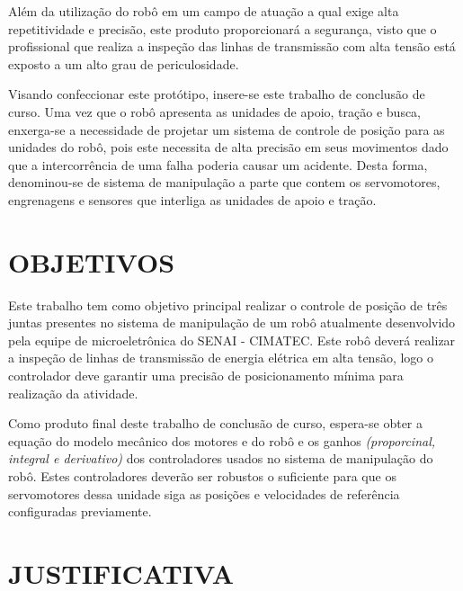 \documentclass[12pt,oneside,a4paper, chapter=TITLE, section = TITLE, english, brazil]{abntex2}
\begin{document}
Além da utilização do robô em um campo de atuação a qual exige alta repetitividade e precisão, este produto proporcionará a segurança, visto que o profissional que realiza a inspeção das linhas de transmissão com alta tensão está exposto a um alto grau de periculosidade.


Visando confeccionar este protótipo, insere-se este trabalho de conclusão de curso. Uma vez que o robô apresenta as unidades de apoio, tração e busca, enxerga-se a necessidade de projetar um sistema de controle de posição para as unidades do robô, pois este necessita de alta precisão em seus movimentos dado que a intercorrência de uma falha poderia causar um acidente. Desta forma, denominou-se de sistema de manipulação a parte que contem os servomotores, engrenagens e sensores que interliga as unidades de apoio e tração.


\section{OBJETIVOS} %

Este trabalho tem como objetivo principal realizar o controle de posição de três juntas presentes no sistema de manipulação de um robô atualmente desenvolvido pela equipe de microeletrônica do SENAI - CIMATEC. Este robô deverá realizar a inspeção de linhas de transmissão de energia elétrica em alta tensão, logo o controlador deve garantir uma precisão de posicionamento mínima para realização da atividade.

Como produto final deste trabalho de conclusão de curso, espera-se obter a equação do modelo mecânico dos motores e do robô e os ganhos \textit{(proporcinal, integral e derivativo)} dos controladores usados no sistema de manipulação do robô. Estes controladores deverão ser robustos o suficiente para que os servomotores dessa unidade siga as posições e velocidades de referência configuradas previamente.

\section{JUSTIFICATIVA} %
\end{document}
